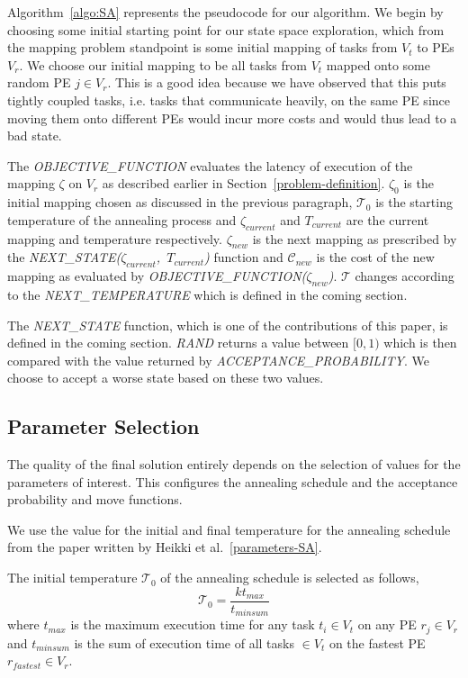 Algorithm~\ref{algo:SA} represents the pseudocode for our algorithm. We begin by
choosing some initial starting point for our state space exploration, which from
the mapping problem standpoint is some initial mapping of tasks from $V_t$ to
PEs $V_r$. We choose our initial mapping to be all tasks from $V_t$ mapped onto
some random PE $j \in V_r$. This is a good idea because we have observed that
this puts tightly coupled tasks, i.e. tasks that communicate heavily, on the
same PE since moving them onto different PEs would incur more costs and would thus
lead to a bad state.

The \textit{OBJECTIVE\_FUNCTION} evaluates the latency of execution of the
mapping $\zeta$ on $V_r$ as described earlier in
Section~\ref{problem-definition}. $\zeta_0$ is the initial mapping chosen as
discussed in the previous paragraph, $\mathcal{T}_0$ is the starting
temperature of the annealing process and $\zeta_{current}$ and $T_{current}$ are
the current mapping and temperature respectively. $\zeta_{new}$ is the next
mapping as prescribed by the \mbox{\textit{NEXT\_STATE($\zeta_{current}$,
$T_{current}$)}} function and $\mathcal{C}_{new}$ is the cost of the new mapping
as evaluated by \textit{OBJECTIVE\_FUNCTION($\zeta_{new}$)}. $\mathcal{T}$
changes according to the \textit{NEXT\_TEMPERATURE} which is defined in the
coming section.

The \textit{NEXT\_STATE} function, which is one of the contributions of this
paper, is defined in the coming section. \textit{RAND} returns a value between
$[0, 1)$ which is then compared with the value returned by
\textit{ACCEPTANCE\_PROBABILITY}. We choose to accept a worse state based on
these two values.

\subsection{Parameter Selection}
The quality of the final solution entirely depends on the selection of values
for the parameters of interest. This configures the annealing schedule and the
acceptance probability and move functions.

We use the value for the initial and final temperature for the annealing
schedule from the paper written by Heikki et al.~\ref{parameters-SA}. 

The initial temperature $\mathcal{T}_0$ of the annealing schedule is selected as
follows,
\begin{equation}
\mathcal{T}_0 = \frac{kt_{max}}{t_{minsum}}
\end{equation}
where $t_{max}$ is the maximum execution time for any task $t_i \in V_t$ on any
PE $r_j \in V_r$ and $t_{minsum}$ is the sum of execution time of all tasks $\in
V_t$ on the fastest PE $r_{fastest} \in V_r$.

